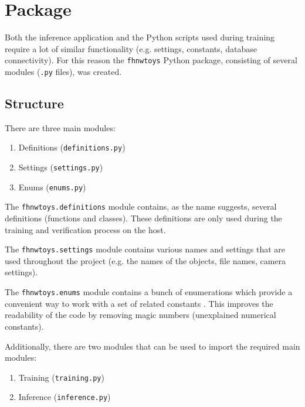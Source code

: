 \section{Package}
\label{sec:inference:package}

Both the inference application and the Python scripts used during training require a lot of similar functionality (e.g. settings, constants, database connectivity).
For this reason the \texttt{fhnwtoys} Python package, consisting of several modules (\texttt{.py} files), was created.

\subsection{Structure}
\label{subsec:inference:package:structure}
There are three main modules:
\begin{enumerate}
  \item Definitions (\texttt{definitions.py})
  \item Settings (\texttt{settings.py})
  \item Enums (\texttt{enums.py})
\end{enumerate}

The \texttt{fhnwtoys.definitions} module contains, as the name suggests, several definitions (functions and classes).
These definitions are only used during the training and verification process on the host.

The \texttt{fhnwtoys.settings} module contains various names and settings that are used throughout the project (e.g. the names of the objects, file names, camera settings).

The \texttt{fhnwtoys.enums} module contains a bunch of enumerations which provide a convenient way to work with a set of related constants \cite{inf_enum}.
This improves the readability of the code by removing magic numbers (unexplained numerical constants).

Additionally, there are two modules that can be used to import the required main modules:
\begin{enumerate}
  \item Training (\texttt{training.py})
  \item Inference (\texttt{inference.py})
\end{enumerate}

